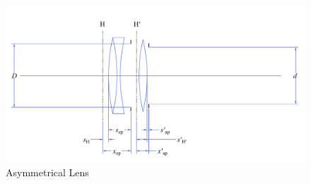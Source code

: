 \documentclass[11pt, oneside]{scrartcl}   	%
\begin{document}
\begin{figure}[htbp] %
   \centering
   \includegraphics[width=\linewidth]{figure/fig_dofd_2} 
   \caption{Asymmetrical Lens}
   \label{fig:asymlens}
\end{figure}
\end{document}
